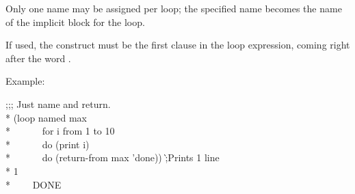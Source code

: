 \begin{new}
\begin{defloop}
Only one name may be assigned per loop; the specified name becomes the
name of the implicit block for the loop.

If used, the 
construct must be the first clause in the loop expression, coming right after the
word .

Example:
\begin{lisp}
;;; Just name and return. \\*
(loop named max \\*
~~~~~~for i from 1 to 10 \\*
~~~~~~do (print i) \\*
~~~~~~do (return-from max 'done)) \`;{\rm Prints 1 line}\\*
1  \\*
~~~\EV~DONE
\end{lisp}
\end{defloop}



\end{new}
